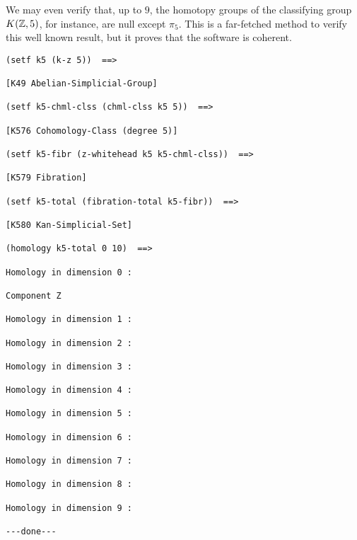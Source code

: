 We may even verify that, up to $9$, the homotopy groups of the classifying group $K({{\Bbb Z}},5)$, for instance,
are null except $\pi_5$. This is a far-fetched method to verify this well known result, but
it proves that the software is coherent.
{\footnotesize\begin{verbatim}
(setf k5 (k-z 5))  ==>

[K49 Abelian-Simplicial-Group]

(setf k5-chml-clss (chml-clss k5 5))  ==>

[K576 Cohomology-Class (degree 5)]

(setf k5-fibr (z-whitehead k5 k5-chml-clss))  ==>

[K579 Fibration]

(setf k5-total (fibration-total k5-fibr))  ==>

[K580 Kan-Simplicial-Set]

(homology k5-total 0 10)  ==>

Homology in dimension 0 :

Component Z

Homology in dimension 1 :

Homology in dimension 2 :

Homology in dimension 3 :

Homology in dimension 4 :

Homology in dimension 5 :

Homology in dimension 6 :

Homology in dimension 7 :

Homology in dimension 8 :

Homology in dimension 9 :

---done---
\end{verbatim}}

